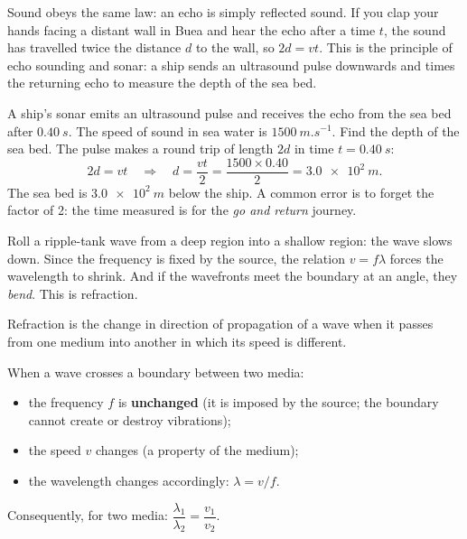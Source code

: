 \documentclass[11pt]{article}
\newcommand{\cle}[1]{{\popxbold\color{popdark}#1}}
\newcounter{popsec}
\newcounter{popsub}
\newcommand{\courssub}[1]{%
  \stepcounter{popsub}%
  \par\vspace{9pt}\noindent{\popxbold\fontsize{11.5}{13}\selectfont\color{popink}{\color{poporange}\thepopsec.\thepopsub}\hspace{6pt}#1}\par\nopagebreak\vspace{4pt}
}
\begin{document}
Sound obeys the same law: an \cle{echo} is simply reflected sound. If you clap your hands facing a distant wall in Buea and hear the echo after a time $t$, the sound has travelled twice the distance $d$ to the wall, so $2d = vt$. This is the principle of \cle{echo sounding} and \cle{sonar}: a ship sends an ultrasound pulse downwards and times the returning echo to measure the depth of the sea bed.

\begin{exoresolu}
A ship's sonar emits an ultrasound pulse and receives the echo from the sea bed after $\SI{0.40}{s}$. The speed of sound in sea water is $\SI{1500}{m.s^{-1}}$. Find the depth of the sea bed.
\tcblower
The pulse makes a round trip of length $2d$ in time $t = \SI{0.40}{s}$:
\[
2d = vt \quad\Longrightarrow\quad d = \frac{vt}{2} = \frac{1500 \times 0.40}{2} = \SI{3.0e2}{m}.
\]
The sea bed is $\SI{3.0e2}{m}$ below the ship. A common error is to forget the factor of 2: the time measured is for the \emph{go and return} journey.
\end{exoresolu}

\courssub{Refraction of Waves}

Roll a ripple-tank wave from a deep region into a shallow region: the wave slows down. Since the frequency is fixed by the source, the relation $v = f\lambda$ forces the wavelength to shrink. And if the wavefronts meet the boundary at an angle, they \emph{bend}. This is \cle{refraction}.

\begin{definition}[Refraction]
\cle{Refraction} is the change in direction of propagation of a wave when it passes from one medium into another in which its speed is different.
\end{definition}

\begin{propriete}
When a wave crosses a boundary between two media:
\begin{itemize}
\item the \cle{frequency} $f$ is \textbf{unchanged} (it is imposed by the source; the boundary cannot create or destroy vibrations);
\item the speed $v$ changes (a property of the medium);
\item the wavelength changes accordingly: $\lambda = v/f$.
\end{itemize}
Consequently, for two media: $\dfrac{\lambda_1}{\lambda_2} = \dfrac{v_1}{v_2}$.
\end{propriete}
\end{document}
